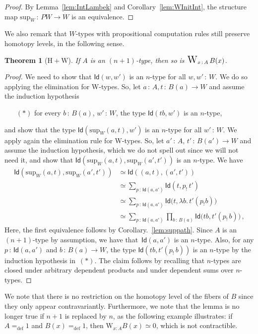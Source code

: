 \documentclass[10pt,a4paper,oneside,reqno]{amsart}
\theoremstyle{mythm}
\newtheorem{theorem}{Theorem}[section]
\theoremstyle{mydef}
\theoremstyle{myrmk}
\newcommand{\defeq}{=_{\mathrm{def}}}
\newcommand{\co}{\,{:}\,}
\newcommand{\Hint}{\mathrm{H}}
\newcommand{\Id}{\mathsf{Id}}
\newcommand{\W}{\mathrm{W}}
\DeclareMathOperator*{\WW}{\text{\Large $\mathrm{W}$}}
\renewcommand{\sup}{\mathrm{sup}}
\begin{document}
\begin{proof}
By Lemma~\ref{lem:IntLambek} and Corollary~\ref{lem:WInitInt}, the structure map $\sup_W \co PW \to W$ is an equivalence.
\end{proof}

We also remark that $W$-types with propositional computation rules still preserve homotopy levels, in the following sense.

\begin{theorem}[$\Hint + \W$]
If $A$ is an $(n+1)$-type, then so is $\WW_{x \co A} B(x)$.
\end{theorem}


\begin{proof}
We need to show that $\Id(w, w')$ is an $n$-type for all $w, w' \co W$. We do so applying the elimination for W-types.
So, let $a \co A, t \co B(a) \to W$ and assume the induction hypothesis 
\begin{itemize}
\item[$(\ast)$] for every $b \co B(a)$, $w' \co W$, the type $\Id(tb,w')$ is an $n$-type, 
\end{itemize}
and show that  the type $\Id(\sup_W(a,t), w')$ is an $n$-type for all $w' \co W$. We apply again the elimination rule for W-types. So, let   $a' \co A$, $t' \co B(a') \to W$ and assume the induction hypothesis, which we do not spell out since we will not need it, and show that $\Id( \sup_W(a,t) , \sup_W(a',t'))$ is an $n$-type. We have
\begin{align*} 
\Id(\sup_W(a,t), \sup_W(a',t'))
& \simeq \Id((a,t) , (a',t')) \\
& \simeq \sum_{p \co \Id(a, a')} \Id( t , p_{!} \, t' )   \\
& \simeq \sum_{p \co \Id(a,a')}  \Id\big(t, \lambda b. \,  t'( p_{!} b)\big) \\
& \simeq \sum_{p \co \Id(a,a')} \prod_{b \co B(a)} \Id \big( tb , t'(p_{!} \, b)\big) \, , 
\end{align*}
Here, the first equivalence follows by Corollary.~\ref{lem:suppath}. Since $A$ is an $(n+1)$-type by assumption, we have 
that~$\Id(a,a')$ is an $n$-type. Also, for any $p \co \Id(a,a')$ and $b \co B(a) \to W$, the type $\Id(tb,  t'(p_{!} \, b))$ is an $n$-type by the 
induction 
hypothesis in~$(\ast)$. The claim follows by recalling that $n$-types are closed under arbitrary dependent products and under dependent 
sums over $n$-types. 
\end{proof}

We note that there is no restriction on the homotopy level of the fibers of $B$ since they only appear contravariantly. Furthermore, we note that the lemma is no longer true if $n+1$ is replaced by $n$, as the following example
illustrates: if $A \defeq 1$ and $B(x) \defeq 1$, then $\W_{x:A} B(x) \simeq 0$, which is not contractible. 
\end{document}

